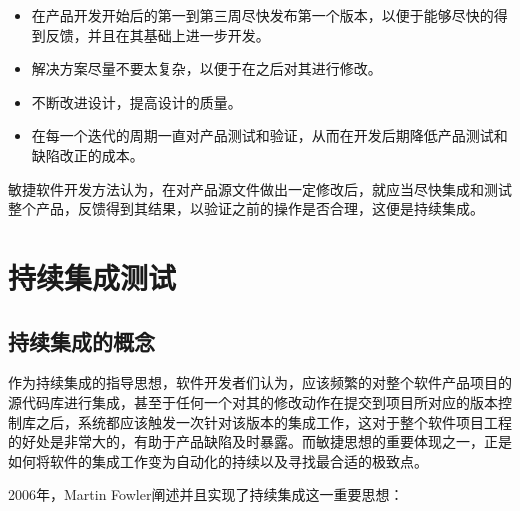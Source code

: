 \begin{itemize}
	  \begin{itemize}
		\item 在产品开发开始后的第一到第三周尽快发布第一个版本，以便于能够尽快的得到反馈，并且在其基础上进一步开发。		
		\item 解决方案尽量不要太复杂，以便于在之后对其进行修改。
		\item 不断改进设计，提高设计的质量。
		\item 在每一个迭代的周期一直对产品测试和验证，从而在开发后期降低产品测试和缺陷改正的成本。
	  \end{itemize}
	
	敏捷软件开发方法认为，在对产品源文件做出一定修改后，就应当尽快集成和测试整个产品，反馈得到其结果，以验证之前的操作是否合理，这便是持续集成。
	
  \end{itemize}
  
  
\section{持续集成测试}

\subsection{持续集成的概念}

	作为持续集成的指导思想，软件开发者们认为，应该频繁的对整个软件产品项目的源代码库进行集成，甚至于任何一个对其的修改动作在提交到项目所对应的版本控制库之后，系统都应该触发一次针对该版本的集成工作，这对于整个软件项目工程的好处是非常大的，有助于产品缺陷及时暴露。而敏捷思想的重要体现之一，正是如何将软件的集成工作变为自动化的持续以及寻找最合适的极致点。~\cite{13}
	
	2006年，Martin Fowler阐述并且实现了持续集成这一重要思想：
	
